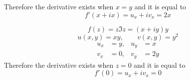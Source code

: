 \documentclass{article}
\begin{document}
Therefore the derivative exists when $x=y$
and it is equal to 
\[
	f'(x + ix) = u_x + iv_x = 2x
\]

\[
	f(z) = z\Im z = (x+iy)y
\]
\[
	u(x,y) = xy, \qquad v(x,y) = y^2
\]
\begin{equation*}
	\begin{aligned}
		u_x &= y, & u_y &= x  \\
		v_x &= 0, & v_y &= 2y
	\end{aligned}
\end{equation*}
Therefore the derivative exists when $z=0$
and it is equal to 
\[
	f'(0) = u_x + iv_x = 0
\]
\end{document}

